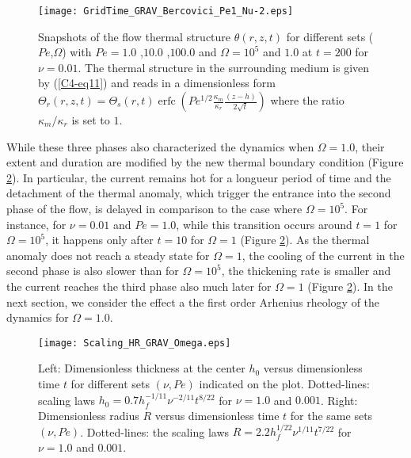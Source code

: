 \begin{figure}[htpb]
  \begin{center}
    \graphicspath{ {/Users/thorey/Documents/These/Projet/Refroidissement/Skin_Model/Figure/Figure_Heating/} }
    \texttt{[image: GridTime\_GRAV\_Bercovici\_Pe1\_Nu-2.eps]}
    \caption{Snapshots of  the flow thermal  structure $\theta(r,z,t)$
      for  different  sets  ($Pe$,$\Omega$)  with  $Pe=  1.0$  ,$10.0$
      ,$100.0$   and   $\Omega=10^5$   and  $1.0$   at   $t=200$   for
      $\nu=0.01$. The  thermal structure in the  surrounding medium is
      given  by  (\ref{C4-eq11}) and  reads  in  a dimensionless  form
      $\Theta_r(r,z,t)=\Theta_s(r,t)\operatorname{erfc}{\left(Pe^{1/2}\frac{\kappa_m}{\kappa_r}\frac{(z-h)}{2\sqrt{t}}\right)}$
      where the ratio $\kappa_m/\kappa_r$ is set to $1$.}
    \label{C4-Grid_TIME_GRAV}
  \end{center}
\end{figure}

While  these  three  phases   also  characterized  the  dynamics  when
$\Omega=1.0$,  their  extent and  duration  are  modified by  the  new
thermal  boundary  condition (Figure  \ref{C4-Scaling_HR_GRAV_Omega}).
In particular, the  current remains hot for a longueur  period of time
and the detachment of the  thermal anomaly, which trigger the entrance
into the  second phase of  the flow, is  delayed in comparison  to the
case where $\Omega =10^5$.  For instance, for $\nu=0.01$ and $Pe=1.0$,
while  this  transition  occurs  around $t=1$  for  $\Omega=10^5$,  it
happens     only    after     $t=10$     for    $\Omega=1$     (Figure
\ref{C4-Scaling_HR_GRAV_Omega}).   As  the  thermal anomaly  does  not
reach a steady state for $\Omega=1$, the cooling of the current in the
second phase  is also  slower than  for $\Omega=10^5$,  the thickening
rate is  smaller and  the current  reaches the  third phase  also much
later for $\Omega=1$  (Figure \ref{C4-Scaling_HR_GRAV_Omega}).  In the
next  section, we  consider  the  effect a  the  first order  Arhenius
rheology of the dynamics for $\Omega=1.0$.

\begin{figure}[htpb]
  \begin{center}
    \graphicspath{ {/Users/thorey/Documents/These/Projet/Refroidissement/Skin_Model/Figure/Figure_Heating/} }
    \texttt{[image: Scaling\_HR\_GRAV\_Omega.eps]}
    \caption{Left: Dimensionless thickness at  the center $h_0$ versus
      dimensionless time  $t$ for different sets  $(\nu,Pe)$ indicated
      on      the      plot.      Dotted-lines:      scaling      laws
      $h_0=  0.7h_f^{-1/11}\nu^{-2/11}t^{8/22}$ for  $\nu  = 1.0$  and
      $0.001$.  Right:  Dimensionless radius $R$  versus dimensionless
      time  $t$  for  the  same sets  $(\nu,Pe)$.   Dotted-lines:  the
      scaling    laws    $R=   2.2h_f^{1/22}\nu^{1/11}t^{7/22}$    for
      $\nu = 1.0$ and $0.001$.}
    \label{C4-Scaling_HR_GRAV_Omega}
  \end{center}
\end{figure}

